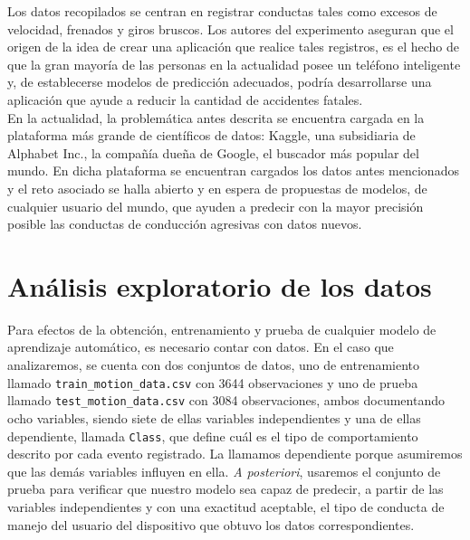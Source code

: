 \documentclass[runningheads]{llncs}
\begin{document}
\textsc Los datos recopilados se centran en registrar conductas tales como excesos de velocidad, frenados y giros bruscos. Los autores del experimento aseguran que el origen de la idea de crear una aplicación que realice tales registros, es el hecho de que la gran mayoría de las personas en la actualidad posee un teléfono inteligente y, de establecerse modelos de predicción adecuados, podría desarrollarse una aplicación que ayude a reducir la cantidad de accidentes fatales. \\

\textsc En la actualidad, la problemática antes descrita se encuentra cargada en la plataforma más grande de científicos de datos: Kaggle, una subsidiaria de Alphabet Inc., la compañía dueña de Google, el buscador más popular del mundo. En dicha plataforma se encuentran cargados los datos antes mencionados y el reto asociado se halla abierto y en espera de propuestas de modelos, de cualquier usuario del mundo, que ayuden a predecir con la mayor precisión posible las conductas de conducción agresivas con datos nuevos. \\


\section{Análisis exploratorio de los datos}

\textsc Para efectos de la obtención, entrenamiento y prueba de cualquier modelo de aprendizaje automático, es necesario contar con datos. En el caso que analizaremos, se cuenta con dos conjuntos de datos, uno de entrenamiento llamado \newline 
\verb|train_motion_data.csv| con 3644 observaciones y uno de prueba llamado \newline
\verb|test_motion_data.csv| con 3084 observaciones, ambos documentando ocho variables, siendo siete de ellas variables independientes y una de ellas dependiente, llamada \verb|Class|, que define cuál es el tipo de comportamiento descrito por cada evento registrado. La llamamos dependiente porque asumiremos que las demás variables influyen en ella. \textit{A posteriori}, usaremos el conjunto de prueba para verificar que nuestro modelo sea capaz de predecir, a partir de las variables independientes y con una exactitud aceptable, el tipo de conducta de manejo del usuario del dispositivo que obtuvo los datos correspondientes. \\
\end{document}
